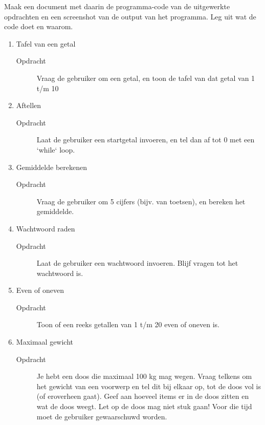 Maak een document met daarin de programma-code van de uitgewerkte opdrachten en een screenshot van de output van het programma. Leg uit wat de code doet en waarom.

\begin{enumerate}
\item Tafel van een getal
	\begin{description}
	\item[Opdracht] Vraag de gebruiker om een getal, en toon de tafel van dat getal van 1 t/m 10
	\end{description}

\item Aftellen
	\begin{description}
	\item[Opdracht] Laat de gebruiker een startgetal invoeren, en tel dan af tot 0 met een `while` loop.
	\end{description}

\item Gemiddelde berekenen
	\begin{description}
	\item[Opdracht] Vraag de gebruiker om 5 cijfers (bijv. van toetsen), en bereken het gemiddelde.
	\end{description}

\item Wachtwoord raden
	\begin{description}
	\item[Opdracht] Laat de gebruiker een wachtwoord invoeren. Blijf vragen tot het wachtwoord  is.
	\end{description}

\item Even of oneven
	\begin{description}
	\item[Opdracht] Toon of een reeks getallen van 1 t/m 20 even of oneven is.
	\end{description}

\item Maximaal gewicht
	\begin{description}
	\item[Opdracht] Je hebt een doos die maximaal 100 kg mag wegen. Vraag telkens om het gewicht van een voorwerp en tel dit bij elkaar op, tot de doos vol is (of eroverheen gaat). Geef aan hoeveel items er in de doos zitten en wat de doos weegt. Let op de doos mag niet stuk gaan! Voor die tijd moet de gebruiker gewaarschuwd worden.
	\end{description}

\end{enumerate}


